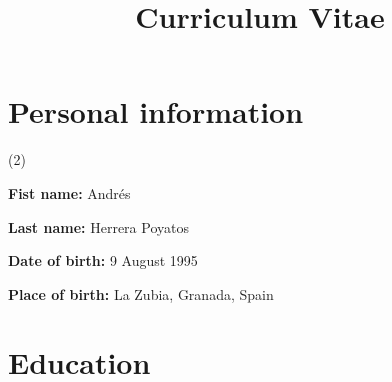 \documentclass[10pt,a4paper,sans]{moderncv} %
\title{Curriculum Vitae}
\begin{document}
\makecvtitle %


\vspace*{-14mm}
\section{Personal information}

\begin{itemlist}[label=~](2)
\item \textbf{Fist name:} Andrés
\item* \textbf{Last name:} Herrera Poyatos
\item	\textbf{Date of birth:} 9 August 1995
\item *\textbf{Place of birth:} La Zubia, Granada, Spain
\end{itemlist}
\vspace*{-4mm}


\section{Education} \label{sec:education}
\end{document}
